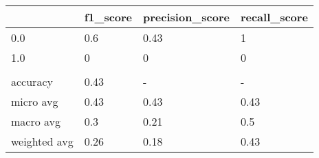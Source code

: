 \begin{tabular}{llll}
\toprule
{} & f1\_score & precision\_score & recall\_score \\
\midrule
0.0          &      0.6 &            0.43 &            1 \\
1.0          &        0 &               0 &            0 \\
             &          &                 &              \\
accuracy     &     0.43 &               - &            - \\
micro avg    &     0.43 &            0.43 &         0.43 \\
macro avg    &      0.3 &            0.21 &          0.5 \\
weighted avg &     0.26 &            0.18 &         0.43 \\
\bottomrule
\end{tabular}
